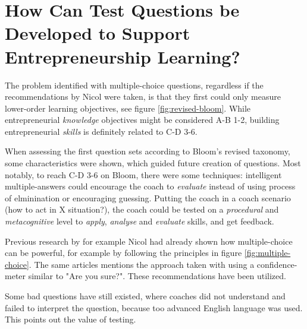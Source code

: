 
\section{How Can Test Questions be Developed to Support Entrepreneurship Learning?} %

  The problem identified with multiple-choice questions, regardless if the recommendations by Nicol \cite{nicol} were taken, is that they first could only measure lower-order learning objectives, see figure \ref{fig:revised-bloom}. While entrepreneurial \textit{knowledge} objectives might be considered A-B 1-2, building entrepreneurial \textit{skills} is definitely related to C-D 3-6.

  When assessing the first question sets according to Bloom's revised taxonomy, some characteristics were shown, which guided future creation of questions. Most notably, to reach C-D 3-6 on Bloom, there were some techniques: intelligent multiple-answers could encourage the coach to \textit{evaluate} instead of using process of elminination or encouraging guessing. Putting the coach in a coach scenario (how to act in X situation?), the coach could be tested on a \textit{procedural} and \textit{metacognitive} level to \textit{apply}, \textit{analyse} and \textit{evaluate} skills, and get feedback.

  Previous research by for example Nicol \cite{nicol} had already shown how multiple-choice can be powerful, for example by following the principles in figure \ref{fig:multiple-choice}. The same articles mentions the approach taken with using a confidence-meter similar to "Are you sure?". These recommendations have been utilized.

  Some bad questions have still existed, where coaches did not understand and failed to interpret the question, because too advanced English language was used. This points out the value of testing.



